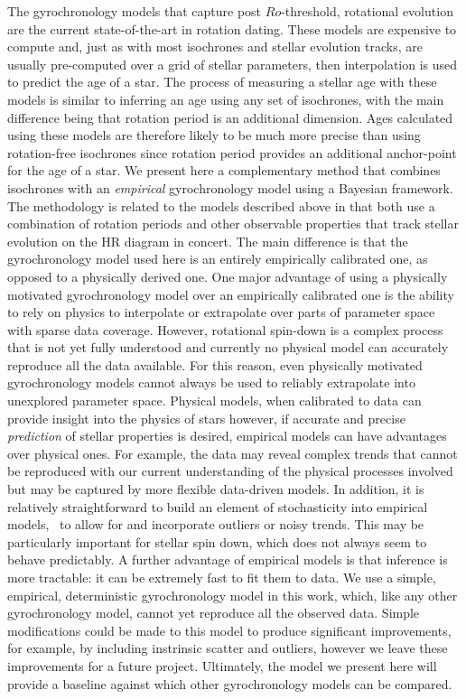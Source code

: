 The gyrochronology models that capture post $Ro$-threshold, rotational
evolution \citep{vansaders2016} are the current state-of-the-art in rotation
dating.
These models are expensive to compute and, just as with most isochrones and
stellar evolution tracks, are usually pre-computed over a grid of stellar
parameters, then interpolation is used to predict the age of a star.
The process of measuring a stellar age with these models is similar to
inferring an age using any set of isochrones, with the main difference being
that rotation period is an additional dimension.
Ages calculated using these models are therefore likely to be much more
precise than using rotation-free isochrones since rotation period provides an
additional anchor-point for the age of a star.
We present here a complementary method that combines isochrones with an {\it
empirical} gyrochronology model using a Bayesian framework.
The methodology is related to the models described above \citep{vansaders2016}
in that both use a combination of rotation periods and other observable
properties that track stellar evolution on the HR diagram in concert.
The main difference is that the gyrochronology model used here is an entirely
empirically calibrated one, as opposed to a physically derived one.
One major advantage of using a physically motivated gyrochronology model over
an empirically calibrated one is the ability to rely on physics to interpolate
or extrapolate over parts of parameter space with sparse data coverage.
However, rotational spin-down is a complex process that is not yet fully
understood and currently no physical model can accurately reproduce all the
data available.
For this reason, even physically motivated gyrochronology models cannot always
be used to reliably extrapolate into unexplored parameter space.
Physical models, when calibrated to data can provide insight into the physics
of stars however, if accurate and precise {\it prediction} of stellar
properties is desired, empirical models can have advantages over physical
ones.
For example, the data may reveal complex trends that cannot be reproduced with
our current understanding of the physical processes involved but may be
captured by more flexible data-driven models.
In addition, it is relatively straightforward to build an element of
stochasticity into empirical models, \ie\ to allow for and incorporate
outliers or noisy trends.
This may be particularly important for stellar spin down, which does not
always seem to behave predictably.
A further advantage of empirical models is that inference is more tractable:
it can be extremely fast to fit them to data.
We use a simple, empirical, deterministic gyrochronology model in this work,
which, like any other gyrochronology model, cannot yet reproduce all the
observed data.
Simple modifications could be made to this model to produce
significant improvements, for example, by including instrinsic scatter and
outliers, however we leave these improvements for a future project.
Ultimately, the model we present here will provide a baseline against which
other gyrochronology models can be compared.

